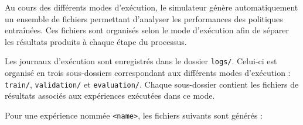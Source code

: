 \noindent Au cours des différents modes d'exécution, le simulateur génère automatiquement un ensemble de fichiers permettant d'analyser les performances des politiques entraînées. Ces fichiers sont organisés selon le mode d'exécution afin de séparer les résultats produits à chaque étape du processus.

\vspace{10pt}

\noindent Les journaux d'exécution sont enregistrés dans le dossier \texttt{logs/}. Celui-ci est organisé en trois sous-dossiers correspondant aux différents modes d'exécution : \texttt{train/}, \texttt{validation/} et \texttt{evaluation/}. Chaque sous-dossier contient les fichiers de résultats associés aux expériences exécutées dans ce mode.

\vspace{10pt}

\noindent Pour une expérience nommée \texttt{<name>}, les fichiers suivants sont générés :

